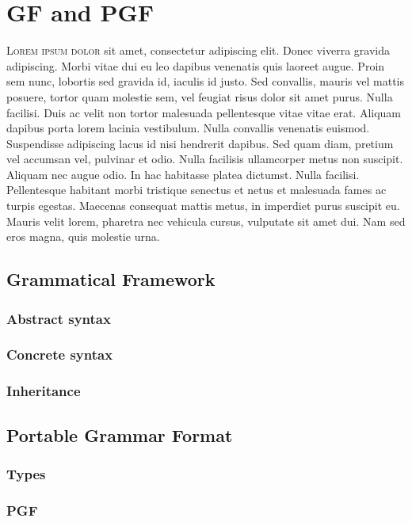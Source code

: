 \chapter{GF and PGF}
\lettrine[lines=4, loversize=-0.1, lraise=0.1]{L}{orem ipsum dolor} sit amet, consectetur adipiscing elit. Donec viverra gravida adipiscing. Morbi vitae dui eu leo dapibus venenatis quis laoreet augue. Proin sem nunc, lobortis sed gravida id, iaculis id justo. Sed convallis, mauris vel mattis posuere, tortor quam molestie sem, vel feugiat risus dolor sit amet purus. Nulla facilisi. Duis ac velit non tortor malesuada pellentesque vitae vitae erat. Aliquam dapibus porta lorem lacinia vestibulum. Nulla convallis venenatis euismod. Suspendisse adipiscing lacus id nisi hendrerit dapibus. Sed quam diam, pretium vel accumsan vel, pulvinar et odio. Nulla facilisis ullamcorper metus non suscipit. Aliquam nec augue odio. In hac habitasse platea dictumst. Nulla facilisi. Pellentesque habitant morbi tristique senectus et netus et malesuada fames ac turpis egestas. Maecenas consequat mattis metus, in imperdiet purus suscipit eu. Mauris velit lorem, pharetra nec vehicula cursus, vulputate sit amet dui. Nam sed eros magna, quis molestie urna.

\section{Grammatical Framework}
\subsection{Abstract syntax}
\subsection{Concrete syntax}
\subsection{Inheritance}

\section{Portable Grammar Format}
\subsection{Types}
\subsection{PGF}
